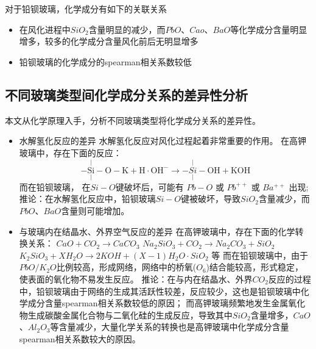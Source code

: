 \documentclass[withoutpreface,bwprint]{cumcmthesis} %
\begin{document}
对于铅钡玻璃，化学成分有如下的关联关系
\begin{itemize}
	\item 在风化进程中$SiO_{2}$含量明显的减少，而$PbO$、$Cao$、$BaO$等化学成分含量明显增多，较多的化学成分含量风化前后无明显增多
	\item 铅钡玻璃的化学成分的spearman相关系数较低
\end{itemize}

\subsection{不同玻璃类型间化学成分关系的差异性分析}

本文从化学原理入手，分析不同玻璃类型将化学成分关系的差异性。

\begin{itemize}

\item 

水解氢化反应的差异 
水解氢化反应对风化过程起着非常重要的作用。 在高钾玻璃中，存在下面的反应： $$-\underset{|} {\mathrm{\overset{|}{Si}}}-\mathrm{O}-\mathrm{K}+\mathrm{H} \cdot \mathrm{OH}^{-} \rightarrow-\underset{|}{\overset{|}{Si}}-\mathrm{OH}+\mathrm{KOH}$$ 而在铅钡玻璃， 在$Si-O$键破坏后，可能有 $Pb-O$ 或 $Pb^{++}$ 或 $Ba^{++}$ 出现; 
推论：在水解氢化反应中，铅钡玻璃$Si-O$键被破坏，导致$SiO_{2}$含量减少，而$PbO$、$BaO$含量则可能增加。

\item 
与玻璃内在结晶水、外界空气反应的差异 
在高钾玻璃中，存在下面的化学转换关系： $CaO+CO_{2} \rightarrow CaCO_{3}$ $Na_{2}SiO_{3} + CO_{2} \rightarrow Na_{2}CO_{3}+SiO_{2}$ $K_{2}SiO_{3}+XH_{2}O \rightarrow 2KOH + (X-1)H_{2}O \cdot SiO_{2}$
等 而在铅钡玻璃中，由于$PbO/K_{2}O$比例较高，形成网络，网络中的桥氧($O_{6}$)结合能较高，形式稳定，使表面的氧化物不易发生反应。 推论：在与内在结晶水、外界$CO_{2}$反应的过程中，铅钡玻璃由于网络的生成其活跃性较差，反应较少，这也是铅钡玻璃中化学成分含量spearman相关系数较低的原因； 而高钾玻璃频繁地发生金属氧化物生成碳酸金属化合物与二氧化硅的生成反应，导致其中$SiO_{2}$含量增多，$CaO$、$Al_{2}O_{3}$等含量减少，大量化学关系的转换也是高钾玻璃中化学成分含量spearman相关系数较大的原因。

\end{itemize}
\end{document}
